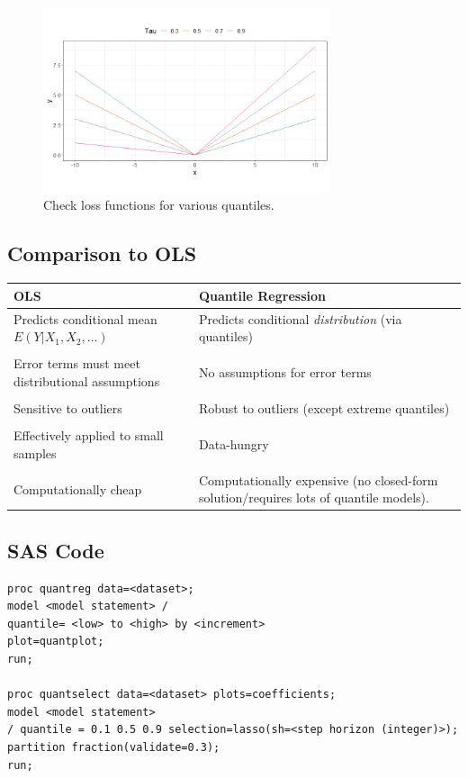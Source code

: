 \documentclass[12pt]{notes}
\begin{document}
\begin{figure}[H]
\centering
\includegraphics[width=0.75\textwidth]{figures/module7/checkloss.png}
\caption{Check loss functions for various quantiles.}
\label{fig:checkloss}
\end{figure}

\subsection{Comparison to OLS}
\begin{tabular}{|p{9cm}|p{9cm}|}
\hline
\textbf{OLS} & \textbf{Quantile Regression} \\ 
\hline
Predicts conditional mean $E(Y|X_1, X_2, \ldots)$ & Predicts conditional \textit{distribution} (via quantiles) \\
& \\
Error terms must meet distributional assumptions & No assumptions for error terms \\
& \\
Sensitive to outliers  & Robust to outliers (except extreme quantiles) \\
& \\
Effectively applied to small samples & Data-hungry \\
& \\
Computationally cheap & Computationally expensive (no closed-form solution/requires lots of quantile models). \\
\hline
\end{tabular}

\subsection{SAS Code}
\begin{verbatim}
proc quantreg data=<dataset>;
model <model statement> /
quantile= <low> to <high> by <increment>
plot=quantplot;
run;

proc quantselect data=<dataset> plots=coefficients;
model <model statement>
/ quantile = 0.1 0.5 0.9 selection=lasso(sh=<step horizon (integer)>);
partition fraction(validate=0.3);
run;
\end{verbatim}
\end{document}
